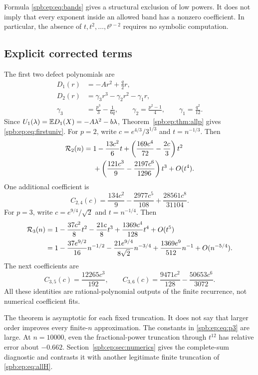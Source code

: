 Formula \eqref{spb:ep:eq:bands} gives a structural exclusion of low powers.
It does not imply that every exponent inside an allowed band has a
nonzero coefficient. In particular, the absence of
$t,t^2,\ldots,t^{p-2}$ requires no symbolic computation.

\subsection{Explicit corrected terms}
The first two defect polynomials are
\begin{align}
 D_1(r)&=-Ar^2+\frac q2r,\label{spb:ep:eq:D1}\\
 D_2(r)&=\gamma_3r^3-\gamma_2r^2-\gamma_1r,\label{spb:ep:eq:D2}\\
 \gamma_3&=\frac{p^3}{3}-\frac1{6q},\qquad
 \gamma_2=\frac{p^2-1}{4},\qquad \gamma_1=\frac{q^2}{12}.\nonumber
\end{align}
Since $U_1(\lambda)=\mathbb E D_1(X)=-A\lambda^2-b\lambda$,
Theorem~\ref{spb:ep:thm:allp} gives \eqref{spb:ep:eq:firstuniv}.
For $p=2$, write $c=e^{4/3}/3^{1/3}$ and $t=n^{-1/3}$. Then
\begin{align}\label{spb:ep:eq:p2}
 \mathcal R_2(n)={}&1-\frac{13c^2}{6}t
 +\left(\frac{169c^4}{72}-\frac{2c}{3}\right)t^2\nonumber\\
 &+\left(\frac{121c^3}{9}-\frac{2197c^6}{1296}\right)t^3
 +O(t^4).
\end{align}
One additional coefficient is
\[
 C_{2,4}(c)=\frac{134c^2}{9}-\frac{2977c^5}{108}
                         +\frac{28561c^8}{31104}.
\]
For $p=3$, write $c=e^{9/4}/\sqrt2$ and $t=n^{-1/4}$. Then
\begin{align}\label{spb:ep:eq:p3}
 \mathcal R_3(n)={}&1-\frac{37c^2}{8}t^2-\frac{21c}{8}t^3
        +\frac{1369c^4}{128}t^4+O(t^5)\nonumber\\
 ={}&1-\frac{37e^{9/2}}{16}n^{-1/2}
       -\frac{21e^{9/4}}{8\sqrt2}n^{-3/4}
       +\frac{1369e^9}{512}n^{-1}+O(n^{-5/4}).
\end{align}
The next coefficients are
\[
 C_{3,5}(c)=\frac{12265c^3}{192},\qquad
 C_{3,6}(c)=\frac{9471c^2}{128}-\frac{50653c^6}{3072}.
\]
All these identities are rational-polynomial outputs of the finite
recurrence, not numerical coefficient fits.

\begin{remark}
The theorem is asymptotic for each fixed truncation. It does not say that
larger order improves every finite-$n$ approximation. The constants in
\eqref{spb:ep:eq:p3} are large. At $n=10000$, even the fractional-power
truncation through $t^{12}$ has relative error about $-0.662$.
Section~\ref{spb:ep:sec:numerics} gives the complete-sum diagnostic and contrasts
it with another legitimate finite truncation of \eqref{spb:ep:eq:allH}.
\end{remark}
